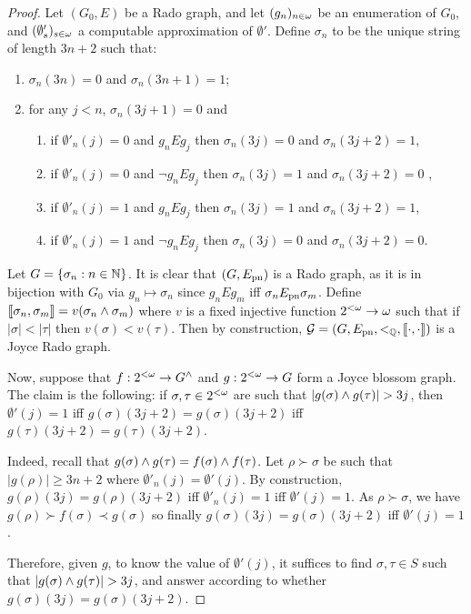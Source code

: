 \begin{proof}
  Let $(G_0,E)$ be a Rado graph, and let $(g_n)_{n\in\omega}$ be an enumeration of $G_0$, and $(\emptyset'_s)_{s\in\omega}$ a computable approximation of $\emptyset'$. Define $\sigma_n$ to be the unique string of length $3n+2$ such that:
  \begin{enumerate}
  \item $\sigma_n(3n)=0$ and $\sigma_n(3n+1)=1$;
  \item for any $j<n$, $\sigma_n(3j+1)=0$ and
    \begin{enumerate}
    \item if $\emptyset'_n(j)=0$ and $g_nEg_j$ then $\sigma_n(3j)=0$ and $\sigma_n(3j+2)=1$,
    \item if $\emptyset'_n(j)=0$ and $\lnot g_nEg_j$ then $\sigma_n(3j)=1$ and $\sigma_n(3j+2)=0$ ,
    \item if $\emptyset'_n(j)=1$ and $g_nEg_j$ then $\sigma_n(3j)=1$ and $\sigma_n(3j+2)=1$,
    \item if $\emptyset'_n(j)=1$ and $\lnot g_nEg_j$ then $\sigma_n(3j)=0$ and $\sigma_n(3j+2)=0$.
    \end{enumerate}
  \end{enumerate}
  Let $G = \{\sigma_n:n\in\mathbb{N}\}$. It is clear that $(G,E_{\mathrm{pn}})$ is a Rado graph, as it is in bijection with $G_0$ via $g_n\mapsto \sigma_n$ since $g_nEg_m$ iff $\sigma_nE_{\mathrm{pn}}\sigma_m$. Define $\llbracket \sigma_n , \sigma_m \rrbracket=v(\sigma_n\wedge\sigma_m)$ where $v$ is a fixed injective function ${2^{<\omega}}\to\omega$ such that if $|\sigma|<|\tau|$ then $v(\sigma)<v(\tau)$. Then by construction, $\mathcal{G}=(G,E_{\mathrm{pn}},<_{\mathbb{Q}},\llbracket \cdot , \cdot \rrbracket)$ is a Joyce Rado graph.

  Now, suppose that $f:{2^{<\omega}}\to {G}^{\wedge}$ and $g:{2^{<\omega}}\to G$ form a Joyce blossom graph.
  The claim is the following: if $\sigma,\tau\in{2^{<\omega}}$ are such that $|g(\sigma)\meet g(\tau)|>3j$, then $\emptyset'(j)=1$ iff $g(\sigma)(3j+2)=g(\sigma)(3j+2)$ iff $g(\tau)(3j+2)=g(\tau)(3j+2)$.

  Indeed, recall that $g(\sigma)\wedge g(\tau)=f(\sigma)\wedge f(\tau)$. Let $\rho\succ\sigma$ be such that $|g(\rho)|\geq 3n+2$ where $\emptyset'_{n}(j)=\emptyset'(j)$. By construction, $g(\rho)(3j)=g(\rho)(3j+2)$ iff $\emptyset'_{n}(j)=1$ iff $\emptyset'(j)=1$. As $\rho\succ\sigma$, we have $g(\rho)\succ f(\sigma)\prec g(\sigma)$ so finally $g(\sigma)(3j)=g(\sigma)(3j+2)$ iff $\emptyset'(j)=1$. %

  Therefore, given $g$, to know the value of $\emptyset'(j)$, it suffices to find $\sigma,\tau\in S$ such that $|g(\sigma)\meet g(\tau)|>3j$, and answer according to whether $g(\sigma)(3j)=g(\sigma)(3j+2)$.
\end{proof}

